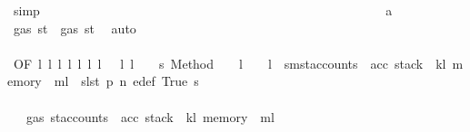 \begin{isabellebody}
\ simp\isanewline
\ \ \ \ \ \ \ \ \ \ \ \ \ \ \ \ \ \ \ \ \ \ \ \ \ \ \ \ \ \ \ \ \ \ \ \ \ \ \ \ \ \ \ \ \ \ \ \ \ \ \ \ \isamarkupfalse%
\ a{}\ \isamarkupfalse%
\ {\isachardoublequoteopen}gas\ st{}{\isacharprime}{\kern0pt}\ {\isasymle}\ gas\ st{\isacharprime}{\kern0pt}{\isacharprime}{\kern0pt}{\isacharprime}{\kern0pt}{\isacharprime}{\kern0pt}{\isacharprime}{\kern0pt}{\isachardoublequoteclose}\ \isamarkupfalse%
\ auto\isanewline
\ \ \ \ \ \ \ \ \ \ \ \ \ \ \ \ \ \ \ \ \ \ \ \ \ \ \ \ \ \ \ \ \ \ \ \ \ \ \ \ \ \ \ \ \ \ \ \ \ \ \ \ \isamarkupfalse%
\ \isamarkupfalse%
\ {}{\isacharparenleft}{\kern0pt}{}{\isacharparenright}{\kern0pt}{\isacharbrackleft}{\kern0pt}OF\ l{}\ l{}\ l{}\ l{}\ l{}\ l{}\ l{}\ {\isacharunderscore}{\kern0pt}\ {\isacharunderscore}{\kern0pt}\ l{}\ l{}\ {\isacharunderscore}{\kern0pt}\ {\isacharunderscore}{\kern0pt}\ {\isacharunderscore}{\kern0pt}\ s{}\ Method\ {\isacharunderscore}{\kern0pt}\ {\isacharunderscore}{\kern0pt}\ {\isacharunderscore}{\kern0pt}\ l{}{}\ {\isacharunderscore}{\kern0pt}\ {\isacharunderscore}{\kern0pt}\ {\isacharunderscore}{\kern0pt}\ l{}{}{\isacharcomma}{\kern0pt}\ \ {\isacharquery}{\kern0pt}s{\isacharprime}{\kern0pt}m{\isacharequal}{\kern0pt}{\isachardoublequoteopen}st{\isacharprime}{\kern0pt}{\isacharprime}{\kern0pt}{\isacharprime}{\kern0pt}{\isacharprime}{\kern0pt}{\isasymlparr}accounts\ {\isacharcolon}{\kern0pt}{\isacharequal}{\kern0pt}\ acc{\isacharcomma}{\kern0pt}\ stack\ {\isacharcolon}{\kern0pt}{\isacharequal}{\kern0pt}\ k\isactrlsub l{\isacharcomma}{\kern0pt}\ memory\ {\isacharcolon}{\kern0pt}{\isacharequal}{\kern0pt}\ m\isactrlsub l{\isasymrparr}{\isachardoublequoteclose}\ \ {\isacharquery}{\kern0pt}s{\isacharprime}{\kern0pt}l{\isacharequal}{\kern0pt}st{\isacharprime}{\kern0pt}{\isacharprime}{\kern0pt}{\isacharprime}{\kern0pt}{\isacharprime}{\kern0pt}{\isacharbrackright}{\kern0pt}\ p{}\ n{}\ e{\isacharprime}{\kern0pt}{\isacharunderscore}{\kern0pt}def\ True\ s{}\isanewline
\ \ \ \ \ \ \ \ \ \ \ \ \ \ \ \ \ \ \ \ \ \ \ \ \ \ \ \ \ \ \ \ \ \ \ \ \ \ \ \ \ \ \ \ \ \ \ \ \ \ \ \ \ \ \isamarkupfalse%
\ {\isachardoublequoteopen}{\isasymdots}\ {\isasymle}\ gas\ {\isacharparenleft}{\kern0pt}st{\isacharprime}{\kern0pt}{\isacharprime}{\kern0pt}{\isacharprime}{\kern0pt}{\isacharprime}{\kern0pt}{\isasymlparr}accounts\ {\isacharcolon}{\kern0pt}{\isacharequal}{\kern0pt}\ acc{\isacharcomma}{\kern0pt}\ stack\ {\isacharcolon}{\kern0pt}{\isacharequal}{\kern0pt}\ k\isactrlsub l{\isacharcomma}{\kern0pt}\ memory\ {\isacharcolon}{\kern0pt}{\isacharequal}{\kern0pt}\ m\isactrlsub l{\isasymrparr}{\isacharparenright}{\kern0pt}{\isachardoublequoteclose}\ \isamarkupfalse%

\end{isabellebody}
